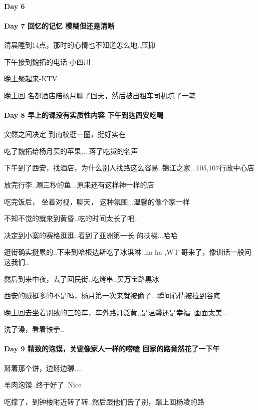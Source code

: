 \documentclass[UTF8,a4paper,8pt]{ctexbook}
\begin{document}
 	 \paragraph{Day 6       \quad     }
 	 \paragraph{Day 7   回忆的记忆    \quad    模糊但还是清晰 }
	 	 清晨睡到14点，那时的心情也不知道怎么地..压抑
	 	 
	 	 下午接到魏拓的电话-小四川
	 	 
	 	 晚上聚起来-KTV
	 	 
	 	 晚上回 名都酒店陪杨月聊了回天，然后被出租车司机坑了一笔
 	 \paragraph{Day 8   早上的课没有实质性内容    \quad    下午到达西安吃喝 }
	 	  突然之间决定 到南校逛一圈，挺好实在
	 	  
	 	  吃了魏拓给杨月买的苹果,...落了吃货的名声
	 	  
	 	  下午到了西安，找酒店，为什么别人找路这么容易..锦江之家...105,107行政中心店
	 	  
	 	  放完行李..涮三秒的鱼...原来还有这样神一样的店
	 	  
	 	  吃完饭后， 坐着对视，聊天， 这种氛围...温馨的像个家一样
	 	  
	 	  不知不觉的就来到黄昏..吃的时间太长了吧..
	 	  
	 	  决定到小寨的赛格逛逛..看到了亚洲第一长 的扶梯...哈哈
	 	  
	 	  逛街确实挺累的..下来到哈根达斯吃了冰淇淋..ha ha ,WT 哥来了，像训话一般问这我们..
	 	  
	 	  然后到来中夜，去了回民街..吃烤串..买万宝路黑冰
	 	  
	 	  西安的贼挺多的不是吗，杨月第一次来就被偷了...瞬间心情被拉到谷底
	 	  
	 	  晚上回去坐着别致的三轮车，车外路灯泛黄,,是温馨还是幸福..画面太美...
	 	  
	 	  洗了澡，看着铁拳..
	 	  
 	 \paragraph{Day 9    精致的泡馍，关键像家人一样的唠嗑    \quad    回家的路竟然花了一下午  }
	 	  掰着那个饼，边掰边聊....
	 	  
	 	  羊肉泡馍..终于好了..Nice
	 	  
	 	  吃撑了，到钟楼附近转了转..然后跟他们告了别，踏上回杨凌的路
	 	  
\end{document}
